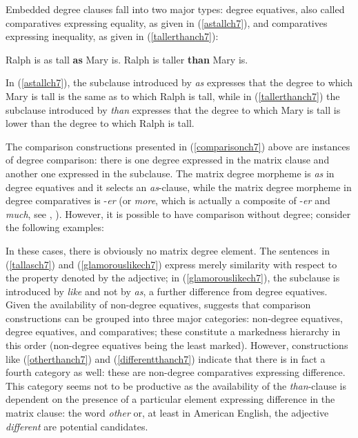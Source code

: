 Embedded degree clauses fall into two major types: degree equatives, also called comparatives expressing equality, as given in (\ref{astallch7}), and comparatives expressing inequality, as given in (\ref{tallerthanch7}):

\ea \label{comparisonch7}
\ea Ralph is as tall \textbf{as} Mary is.\label{astallch7}
\ex Ralph is taller \textbf{than} Mary is.\label{tallerthanch7}
\z
\z

In (\ref{astallch7}), the subclause introduced by \textit{as} expresses that the degree to which Mary is tall is the same as to which Ralph is tall, while in (\ref{tallerthanch7}) the subclause introduced by \textit{than} expresses that the degree to which Mary is tall is lower than the degree to which Ralph is tall.

The comparison constructions presented in (\ref{comparisonch7}) above are instances of degree comparison: there is one degree expressed in the matrix clause and another one expressed in the subclause. The matrix degree morpheme is \textit{as} in degree equatives and it selects an \textit{as}-clause, while the matrix degree morpheme in degree comparatives is -\textit{er} (or \textit{more}, which is actually a composite of -\textit{er} and \textit{much}, see \citealt{bresnan1973}, \citealt{bacskaiatkari2014diss, bacskaiatkari2018langsci}). However, it is possible to have comparison without degree; consider the following examples:

\ea \label{nondegreecomparisonch7}
\z
\z

In these cases, there is obviously no matrix degree element. The sentences in (\ref{tallasch7}) and (\ref{glamorouslikech7}) express merely similarity with respect to the property denoted by the adjective; in (\ref{glamorouslikech7}), the subclause is introduced by \textit{like} and not by \textit{as}, a further difference from degree equatives. Given the availability of non-degree equatives, \citet[35]{jaeger2018} suggests that comparison constructions can be grouped into three major categories: non-degree equatives, degree equatives, and comparatives; these constitute a markedness hierarchy in this order (non-degree equatives being the least marked). However, constructions like (\ref{otherthanch7}) and (\ref{differentthanch7}) indicate that there is in fact a fourth category as well: these are non-degree comparatives expressing difference. This category seems not to be productive as the availability of the \textit{than}-clause is dependent on the presence of a particular element expressing difference in the matrix clause: the word \textit{other} or, at least in American English, the adjective \textit{different} are potential candidates.

